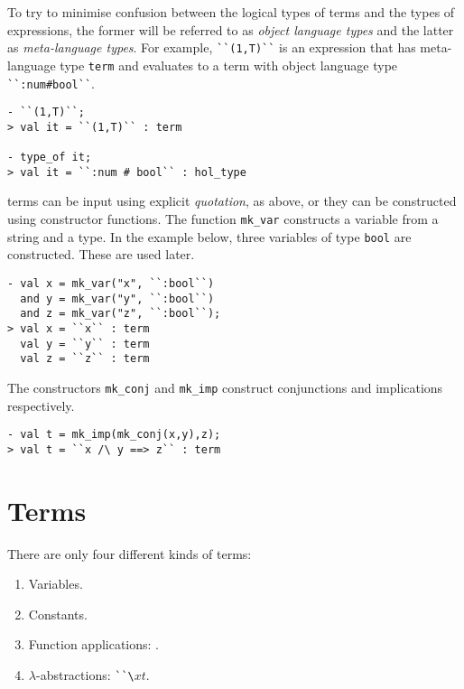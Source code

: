 To try to minimise confusion between the logical types of \HOL{} terms and
the \ML{} types of \ML{} expressions, the former will be referred to as {\it object
language types\/} and the latter as {\it meta-language types\/}.  For example,
{\small\verb|``(1,T)``|} is an \ML{} expression that has meta-language type
{\small\verb|term|} and evaluates to a term with object language type
{\small\verb|``:num#bool``|}.


\begin{session}
\begin{verbatim}
- ``(1,T)``;
> val it = ``(1,T)`` : term

- type_of it;
> val it = ``:num # bool`` : hol_type
\end{verbatim}
\end{session}

\HOL{} terms can be input using explicit {\it quotation\/}, as above, or
they can be constructed using \ML{} constructor functions. The function
{\small\verb|mk_var|} constructs a variable from a string and a type.  In
the example below, three variables of type {\small\verb|bool|} are
constructed.  These are used later.

\begin{session}
\begin{verbatim}
- val x = mk_var("x", ``:bool``)
  and y = mk_var("y", ``:bool``)
  and z = mk_var("z", ``:bool``);
> val x = ``x`` : term
  val y = ``y`` : term
  val z = ``z`` : term
\end{verbatim}
\end{session}

The constructors {\small\verb|mk_conj|} and {\small\verb|mk_imp|} construct
conjunctions and implications respectively.

\begin{session}
\begin{verbatim}
- val t = mk_imp(mk_conj(x,y),z);
> val t = ``x /\ y ==> z`` : term
\end{verbatim}
\end{session}

\section{Terms}

There are only four different kinds of terms:
\begin{enumerate}
\item Variables.
\item Constants.
\item Function applications: .
\item $\lambda$-abstractions: {\small\verb|``\|}$x$$t$.
\end{enumerate}

